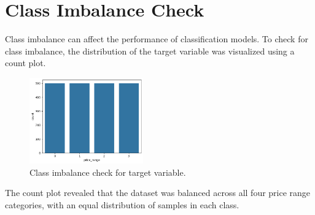 \documentclass[12pt]{report}
\begin{document}
\section{Class Imbalance Check}
Class imbalance can affect the performance of classification models. To check for class imbalance, the distribution of the target variable was visualized using a count plot.
\begin{figure}[H]
	\centering
	\includegraphics[height=10em]{imbalance_check.png}
	\caption{Class imbalance check for target variable.}
	\label{imbalance_check}
\end{figure}
The count plot revealed that the dataset was balanced across all four price range categories, with an equal distribution of samples in each class.
\end{document}
